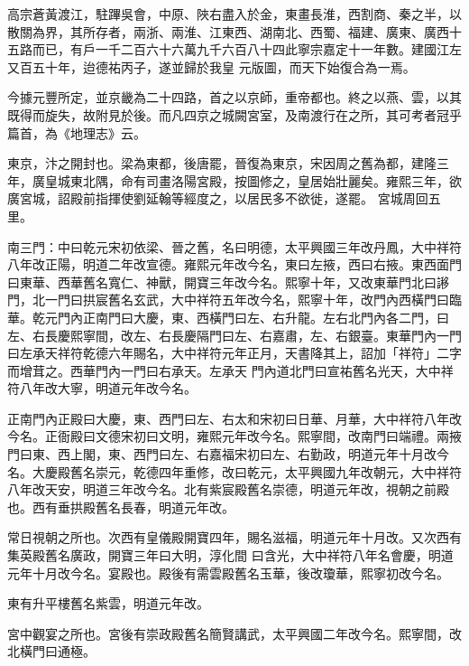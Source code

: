 \begin{pinyinscope}
 高宗蒼黃渡江，駐蹕吳會，中原、陜右盡入於金，東畫長淮，西割商、秦之半，以散關為界，其所存者，兩浙、兩淮、江東西、湖南北、西蜀、福建、廣東、廣西十五路而已，有戶一千二百六十六萬九千六百八十四此寧宗嘉定十一年數。建國江左又百五十年，迨德祐丙子，遂並歸於我皇
 元版圖，而天下始復合為一焉。



 今據元豐所定，並京畿為二十四路，首之以京師，重帝都也。終之以燕、雲，以其既得而旋失，故附見於後。而凡四京之城闕宮室，及南渡行在之所，其可考者冠乎篇首，為《地理志》云。



 東京，汴之開封也。梁為東都，後唐罷，晉復為東京，宋因周之舊為都，建隆三年，廣皇城東北隅，命有司畫洛陽宮殿，按圖修之，皇居始壯麗矣。雍熙三年，欲廣宮城，詔殿前指揮使劉延翰等經度之，以居民多不欲徙，遂罷。
 宮城周回五里。



 南三門：中曰乾元宋初依梁、晉之舊，名曰明德，太平興國三年改丹鳳，大中祥符八年改正陽，明道二年改宣德。雍熙元年改今名，東曰左掖，西曰右掖。東西面門曰東華、西華舊名寬仁、神獸，開寶三年改今名。熙寧十年，又改東華門北曰謻門，北一門曰拱宸舊名玄武，大中祥符五年改今名，熙寧十年，改門內西橫門曰臨華。乾元門內正南門曰大慶，東、西橫門曰左、右升龍。左右北門內各二門，曰左、右長慶熙寧間，改左、右長慶隔門曰左、右嘉肅，左、右銀臺。東華門內一門曰左承天祥符乾德六年賜名，大中祥符元年正月，天書降其上，詔加「祥符」二字而增茸之。西華門內一門曰右承天。左承天
 門內道北門曰宣祐舊名光天，大中祥符八年改大寧，明道元年改今名。



 正南門內正殿曰大慶，東、西門曰左、右太和宋初曰日華、月華，大中祥符八年改今名。正衙殿曰文德宋初曰文明，雍熙元年改今名。熙寧間，改南門曰端禮。兩掖門曰東、西上閣，東、西門曰左、右嘉福宋初曰左、右勤政，明道元年十月改今名。大慶殿舊名崇元，乾德四年重修，改曰乾元，太平興國九年改朝元，大中祥符八年改天安，明道三年改今名。北有紫宸殿舊名崇德，明道元年改，視朝之前殿也。西有垂拱殿舊名長春，明道元年改。



 常日視朝之所也。次西有皇儀殿開寶四年，賜名滋福，明道元年十月改。又次西有集英殿舊名廣政，開寶三年曰大明，淳化間
 曰含光，大中祥符八年名會慶，明道元年十月改今名。宴殿也。殿後有需雲殿舊名玉華，後改瓊華，熙寧初改今名。



 東有升平樓舊名紫雲，明道元年改。



 宮中觀宴之所也。宮後有崇政殿舊名簡賢講武，太平興國二年改今名。熙寧間，改北橫門曰通極。




\end{pinyinscope}

